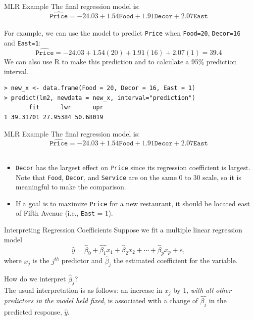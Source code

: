 \documentclass[10pt]{beamer}
\begin{document}
\begin{frame}[fragile]{MLR Example}
The final regression model is:\\
$$\widehat{\texttt{Price}} = -24.03 + 1.54 \texttt{Food} + 1.91 \texttt{Decor} + 2.07\texttt{East}$$ \\
\vspace{10pt}
For example, we can use the model to predict \texttt{Price} when \texttt{Food=20}, \texttt{Decor=16} and \texttt{East=1}:
$$\widehat{\texttt{Price}} = -24.03 + 1.54(20) + 1.91(16) + 2.07(1) = 39.4$$
We can also use R to make this prediction and to calculate a 95\% prediction interval.
\begin{verbatim}
> new_x <- data.frame(Food = 20, Decor = 16, East = 1)
> predict(lm2, newdata = new_x, interval="prediction")
       fit      lwr      upr
1 39.31701 27.95384 50.68019
\end{verbatim}
\end{frame}

\begin{frame}{MLR Example}
The final regression model is:\\
$$\widehat{\texttt{Price}} = -24.03 + 1.54 \texttt{Food} + 1.91 \texttt{Decor} + 2.07\texttt{East}$$ \\

\begin{itemize}
\item \texttt{Decor} has the largest effect on \texttt{Price} since its regression coefficient is largest.  Note that \texttt{Food}, \texttt{Decor}, and \texttt{Service} are on the same 0 to 30 scale, so it is meaningful to make the comparison.  
\vspace{10pt}
\item If a goal is to maximize \texttt{Price} for a new restaurant, it should be located east of Fifth Avenue (i.e., \texttt{East} = 1).
\end{itemize}
\end{frame}


\begin{frame}{Interpreting Regression Coefficients}
Suppose we fit a multiple linear regression model 
$$\hat{y} = \hat{\beta}_0 + \hat{\beta_1} x_1 + \hat{\beta}_2 x_2 + \cdots + \hat{\beta}_p x_p + e,$$
where $x_j$ is the $j^{th}$ predictor and $\hat{\beta}_j$ the estimated coefficient for the variable.\\
\vspace{15pt}

How do we interpret $\hat{\beta}_j$?\\
\vspace{5pt}
The usual interpretation is as follows: an increase in $x_j$ by 1, \emph{with all other predictors in the model held fixed}, is associated with a change of $\hat{\beta_j}$ in the predicted response, $\hat{y}$. 
\end{frame}
\end{document}
